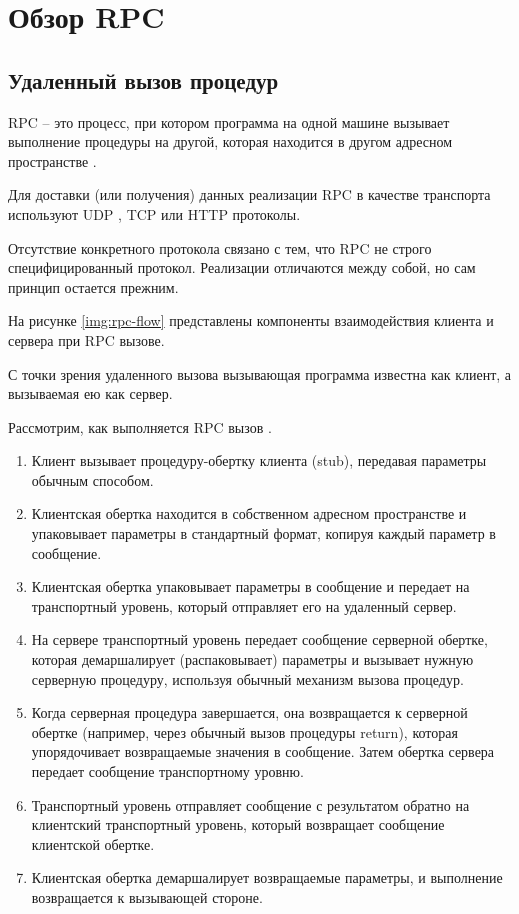 \chapter{Обзор RPC}

\section{Удаленный вызов процедур}

RPC -- это процесс, при котором программа на одной машине вызывает выполнение процедуры на другой, которая находится в другом адресном пространстве \cite{ibm-rpc}. 

Для доставки (или получения) данных реализации RPC в качестве транспорта используют UDP \cite{udp-info}, TCP \cite{tcp-info} или HTTP \cite{http-info} протоколы.

Отсутствие конкретного протокола связано с тем, что RPC не строго специфицированный протокол. Реализации отличаются между собой, но сам принцип остается прежним.  

На рисунке \ref{img:rpc-flow} представлены компоненты взаимодействия клиента и сервера при RPC вызове. 

С точки зрения удаленного вызова вызывающая программа известна как клиент, а вызываемая ею как сервер.

Рассмотрим, как выполняется RPC вызов \cite{rpc-flow}.  

\begin{enumerate}
\item Клиент вызывает процедуру-обертку клиента (stub), передавая параметры обычным способом. 
\item Клиентская обертка находится в собственном адресном пространстве и упаковывает параметры в стандартный формат, копируя каждый параметр в сообщение. 
\item Клиентская обертка упаковывает параметры в сообщение и передает на транспортный уровень, который отправляет его на удаленный сервер.
\item На сервере транспортный уровень передает сообщение серверной обертке, которая демаршалирует (распаковывает) параметры и вызывает нужную серверную процедуру, используя обычный механизм вызова процедур. 
\item Когда серверная процедура завершается, она возвращается к серверной обертке (например, через обычный вызов процедуры return), которая упорядочивает возвращаемые значения в сообщение. Затем обертка сервера передает сообщение транспортному уровню. 
\item Транспортный уровень отправляет сообщение с результатом обратно на клиентский транспортный уровень, который возвращает сообщение клиентской обертке. 
\item Клиентская обертка демаршалирует возвращаемые параметры, и выполнение возвращается к вызывающей стороне.
\end{enumerate}

